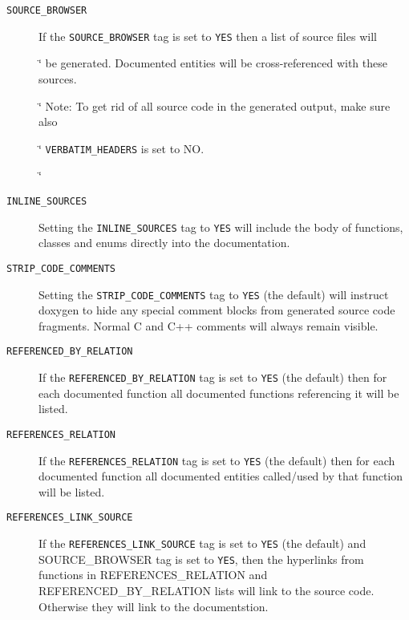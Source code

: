  \begin{description}
\item[{\tt SOURCE\_\-BROWSER} ] If the {\tt SOURCE\_\-BROWSER} tag is set to {\tt YES} then a list of source files will \par
\char`\"{} be generated. Documented entities will be cross-referenced with these sources. \par
\char`\"{} Note: To get rid of all source code in the generated output, make sure also \par
\char`\"{} {\tt VERBATIM\_\-HEADERS} is set to NO. \par
\char`\"{}

\label{config_cfg_inline_sources}
\hypertarget{config_cfg_inline_sources}{}
 \item[{\tt INLINE\_\-SOURCES} ] Setting the {\tt INLINE\_\-SOURCES} tag to {\tt YES} will include the body of functions, classes and enums directly into the documentation.

\label{config_cfg_strip_code_comments}
\hypertarget{config_cfg_strip_code_comments}{}
 \item[{\tt STRIP\_\-CODE\_\-COMMENTS} ] Setting the {\tt STRIP\_\-CODE\_\-COMMENTS} tag to {\tt YES} (the default) will instruct doxygen to hide any special comment blocks from generated source code fragments. Normal C and C++ comments will always remain visible.

\label{config_cfg_referenced_by_relation}
\hypertarget{config_cfg_referenced_by_relation}{}
 \item[{\tt REFERENCED\_\-BY\_\-RELATION} ] If the {\tt REFERENCED\_\-BY\_\-RELATION} tag is set to {\tt YES} (the default) then for each documented function all documented functions referencing it will be listed.

\label{config_cfg_references_relation}
\hypertarget{config_cfg_references_relation}{}
 \item[{\tt REFERENCES\_\-RELATION} ] If the {\tt REFERENCES\_\-RELATION} tag is set to {\tt YES} (the default) then for each documented function all documented entities called/used by that function will be listed.

\label{config_cfg_references_link_source}
\hypertarget{config_cfg_references_link_source}{}
 \item[{\tt REFERENCES\_\-LINK\_\-SOURCE} ] If the {\tt REFERENCES\_\-LINK\_\-SOURCE} tag is set to {\tt YES} (the default) and SOURCE\_\-BROWSER tag is set to {\tt YES}, then the hyperlinks from functions in REFERENCES\_\-RELATION and REFERENCED\_\-BY\_\-RELATION lists will link to the source code. Otherwise they will link to the documentstion.


\end{description}
